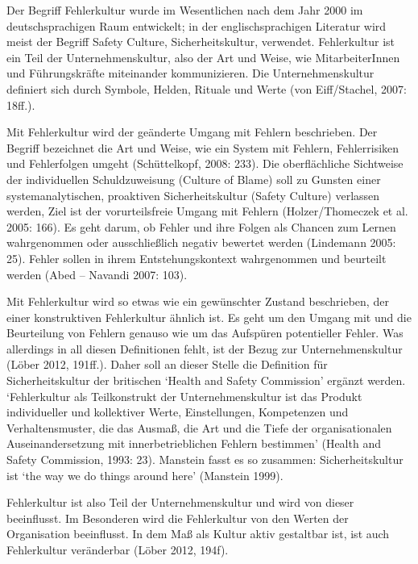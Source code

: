 Der Begriff Fehlerkultur wurde im Wesentlichen nach dem Jahr
2000 im deutschsprachigen Raum entwickelt; in der
englischsprachigen Literatur wird meist der Begriff Safety
Culture, Sicherheitskultur, verwendet. Fehlerkultur ist ein
Teil der Unternehmenskultur, also der Art und Weise, wie
MitarbeiterInnen und Führungskräfte miteinander
kommunizieren. Die Unternehmenskultur definiert sich durch
Symbole, Helden, Rituale und Werte (von Eiff/Stachel, 2007:
18ff.).




Mit Fehlerkultur wird der geänderte Umgang mit Fehlern
beschrieben. Der Begriff bezeichnet die Art und Weise, wie
ein System mit Fehlern, Fehlerrisiken und Fehlerfolgen
umgeht (Schüttelkopf, 2008: 233). Die oberflächliche
Sichtweise der individuellen Schuldzuweisung (Culture of
Blame) soll zu Gunsten einer systemanalytischen, proaktiven
Sicherheitskultur (Safety Culture) verlassen werden, Ziel
ist der vorurteilsfreie Umgang mit Fehlern
(Holzer/Thomeczek et al. 2005: 166). Es geht darum, ob
Fehler und ihre Folgen als Chancen zum Lernen wahrgenommen
oder ausschließlich negativ bewertet werden (Lindemann
2005: 25). Fehler sollen in ihrem Entstehungskontext
wahrgenommen und beurteilt werden (Abed – Navandi 2007:
103).




Mit Fehlerkultur wird so etwas wie ein gewünschter Zustand
beschrieben, der einer konstruktiven Fehlerkultur ähnlich
ist. Es geht um den Umgang mit und die Beurteilung von
Fehlern genauso wie um das Aufspüren potentieller Fehler.
Was allerdings in all diesen Definitionen fehlt, ist der
Bezug zur Unternehmenskultur (Löber 2012, 191ff.). Daher
soll an dieser Stelle die Definition für Sicherheitskultur
der britischen \enquote*{Health and Safety Commission} ergänzt
werden. \enquote*{Fehlerkultur als Teilkonstrukt der
Unternehmenskultur ist das Produkt individueller und
kollektiver Werte, Einstellungen, Kompetenzen und
Verhaltensmuster, die das Ausmaß, die Art und die Tiefe der
organisationalen Auseinandersetzung mit innerbetrieblichen
Fehlern bestimmen} (Health and Safety Commission, 1993:
23). Manstein fasst es so zusammen: Sicherheitskultur ist
\enquote*{the way we do things around here} (Manstein 1999).




Fehlerkultur ist also Teil der Unternehmenskultur und wird
von dieser beeinflusst. Im Besonderen wird die Fehlerkultur
von den Werten der Organisation beeinflusst. In dem Maß als
Kultur aktiv gestaltbar ist, ist auch Fehlerkultur
veränderbar (Löber 2012, 194f).




